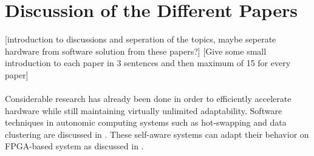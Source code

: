 
\section{Discussion of the Different Papers}

[introduction to discussions and seperation of the topics, maybe seperate hardware from software solution from these papers?]
[Give some small introduction to each paper in 3 sentences and then maximum of 15 for every paper]
\\
\\
Considerable research has already been done in order to efficiently accelerate hardware while still maintaining virtually unlimited adaptability. Software techniques in autonomic computing systems such as hot-swapping and data clustering are discussed in \cite{survey}. These self-aware systems can adapt their behavior on FPGA-based system as discussed in \cite{selfaware}.




